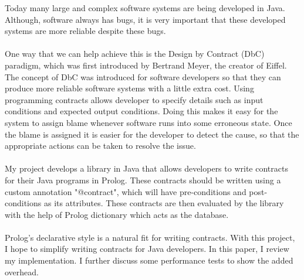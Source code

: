 Today many large and complex software systems are being developed in Java. Although, software
always has bugs, it is very important that these developed 
systems are more reliable despite these bugs. 
\paragraph{}
One way that we can help achieve this is the Design by Contract
(DbC) paradigm, which was first introduced by Bertrand Meyer, the
creator of Eiffel.
The concept of DbC was introduced for software developers so that they
can produce more reliable software systems with a little extra cost.
Using programming contracts allows developer to specify details
such as input conditions and expected output conditions. Doing this
makes it easy for the system to assign blame whenever software runs
into some erroneous state. Once the blame is assigned it is easier for
the developer to detect the cause, so that the appropriate actions can
be taken to resolve the issue. 
\paragraph{} 
My project develops a library in Java that allows 
developers to write contracts for their Java programs in Prolog. These contracts should be written using a custom annotation "@contract", which will have pre-conditions and post-conditions as its attributes. These contracts are then evaluated
by the library with the help of Prolog dictionary which acts as the database. 
\paragraph{}
Prolog's declarative style is a natural fit for writing contracts. With this project, I hope to simplify writing contracts for Java developers. In this paper, I review my implementation. I further discuss some performance tests to show the added overhead.       